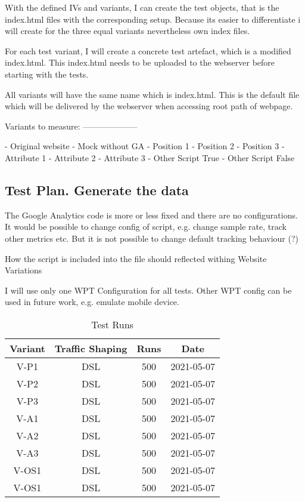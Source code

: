 With the defined IVs and variants, I can create the test objects, that is the index.html files with the corresponding setup.
Because its easier to differentiate i will create for the three equal variants nevertheless own index files.

For each test variant, I will create a concrete test artefact, which is a modified index.html.
This index.html needs to be uploaded to the webserver before starting with the tests.

All variants will have the same name which is index.html. This is the default file which will be delivered by the webserver when accessing root path of webpage.





Variants to measure:
--------------------

- Original website
- Mock without GA
- Position 1
- Position 2
- Position 3
- Attribute 1
- Attribute 2
- Attribute 3
- Other Script True
- Other Script False





\subsection{Test Plan. Generate the data}

The Google Analytics code is more or less fixed and there are no configurations.
It would be possible to change config of script, e.g. change sample rate, track other metrics etc.
But it is not possible to change default tracking behaviour (?)

How the script is included into the file should reflected withing Website Variations

I will use only one WPT Configuration for all tests.
Other WPT config can be used in future work, e.g. emulate mobile device.


\begin{table}[h]
	\caption[Test Runs]{Test Runs \cite{DBLP:books/infix/Schwarz99}}
	\label{tab:tamodelleVergleich}
	\centering
	\begin{tabular}{ |c|c|c|c| } 
	 \hline
	  Variant & Traffic Shaping & Runs & Date \\
	  \hline
	  V-P1 & DSL & 500 & 2021-05-07 \\
	  V-P2 & DSL & 500 & 2021-05-07 \\
	  V-P3 & DSL & 500 & 2021-05-07 \\
	  \hline
	  V-A1 & DSL & 500 & 2021-05-07 \\
	  V-A2 & DSL & 500 & 2021-05-07 \\
	  V-A3 & DSL & 500 & 2021-05-07 \\
	  \hline
	  V-OS1 & DSL & 500 & 2021-05-07 \\
	  V-OS1 & DSL & 500 & 2021-05-07 \\
	  \hline
	  \end{tabular}
\end{table}



